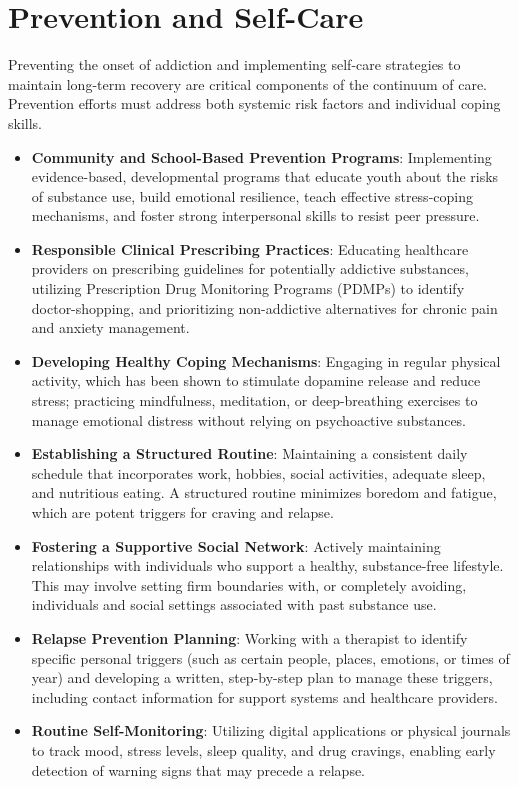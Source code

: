 \section*{Prevention and Self-Care}
Preventing the onset of addiction and implementing self-care strategies to maintain long-term recovery are critical components of the continuum of care. Prevention efforts must address both systemic risk factors and individual coping skills.
\begin{itemize}
    \item \textbf{Community and School-Based Prevention Programs}: Implementing evidence-based, developmental programs that educate youth about the risks of substance use, build emotional resilience, teach effective stress-coping mechanisms, and foster strong interpersonal skills to resist peer pressure.
    \item \textbf{Responsible Clinical Prescribing Practices}: Educating healthcare providers on prescribing guidelines for potentially addictive substances, utilizing Prescription Drug Monitoring Programs (PDMPs) to identify doctor-shopping, and prioritizing non-addictive alternatives for chronic pain and anxiety management.
    \item \textbf{Developing Healthy Coping Mechanisms}: Engaging in regular physical activity, which has been shown to stimulate dopamine release and reduce stress; practicing mindfulness, meditation, or deep-breathing exercises to manage emotional distress without relying on psychoactive substances.
    \item \textbf{Establishing a Structured Routine}: Maintaining a consistent daily schedule that incorporates work, hobbies, social activities, adequate sleep, and nutritious eating. A structured routine minimizes boredom and fatigue, which are potent triggers for craving and relapse.
    \item \textbf{Fostering a Supportive Social Network}: Actively maintaining relationships with individuals who support a healthy, substance-free lifestyle. This may involve setting firm boundaries with, or completely avoiding, individuals and social settings associated with past substance use.
    \item \textbf{Relapse Prevention Planning}: Working with a therapist to identify specific personal triggers (such as certain people, places, emotions, or times of year) and developing a written, step-by-step plan to manage these triggers, including contact information for support systems and healthcare providers.
    \item \textbf{Routine Self-Monitoring}: Utilizing digital applications or physical journals to track mood, stress levels, sleep quality, and drug cravings, enabling early detection of warning signs that may precede a relapse.
\end{itemize}

